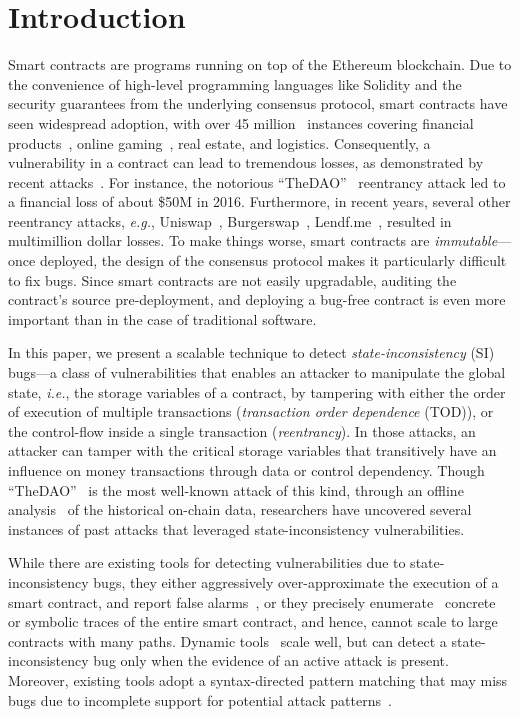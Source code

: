 \documentclass[conference, romanappendices]{tex/IEEEtran}
\theoremstyle{bfnote}
\newcommand{\solidity}{{\sc Solidity}\xspace}
\newcommand{\smart}{smart contract}
\newcommand{\ethereum}{Ethereum}
\newcommand{\reentrancy}{{reentrancy}\xspace}
\newcommand{\tod}{{transaction order dependence}\xspace}
\newcommand{\si}{{state-inconsistency}\xspace}
\newcommand{\eg}{\textit{e.g.}}
\newcommand{\ie}{\textit{i.e.}}
\begin{document}
 	\section{Introduction}
\label{introduction}
Smart contracts are programs running on top of the \ethereum{} blockchain.
Due to the convenience of high-level programming languages like \solidity and the security guarantees from the underlying consensus protocol, smart contracts have seen widespread adoption, with over 45 million~\cite{etherscan} instances covering financial products~\cite{case1}, online gaming~\cite{case2}, real estate, and logistics.
Consequently, a vulnerability in a contract can lead to tremendous losses, as demonstrated by recent attacks~\cite{attack1,attack2,attack3,attack4}.
For instance, the notorious ``TheDAO''~\cite{dao-attack} \reentrancy attack led to a financial loss of about \$50M in 2016.
Furthermore, in recent years, several other \reentrancy attacks, \eg,  Uniswap~\cite{uniswap-attack},  Burgerswap~\cite{burgerswap-attack}, Lendf.me~\cite{lendf-attack}, resulted in multimillion dollar losses.
To make things worse, smart contracts are \emph{immutable}---once deployed, the design of the consensus protocol makes it particularly difficult to fix bugs.
Since \smart s are not easily upgradable, auditing the contract's source pre-deployment, and deploying a bug-free contract is even more important than in the case of traditional software.

In this paper, we present a scalable technique to detect \emph{\si} (SI) bugs---a class of vulnerabilities that enables an attacker to manipulate the global state, \ie, the storage variables of a contract, by tampering with either the order of execution of multiple transactions (\emph{\tod} (TOD)), or the control-flow inside a single transaction (\emph{\reentrancy}).
In those attacks, an attacker can tamper with the critical storage variables that transitively have an influence on money transactions through data or control dependency.
Though ``TheDAO''~\cite{dao-attack} is the most well-known attack of this kind, through an offline analysis~\cite{txspector,sereum} of the historical on-chain data, researchers have uncovered several instances of past attacks that leveraged \si vulnerabilities. 

While there are existing tools for detecting vulnerabilities due to state-inconsistency bugs, they either aggressively over-approximate the execution of a smart contract, and report false alarms~\cite{securify,madmax}, or they precisely enumerate~\cite{mythril,oyente} concrete or symbolic traces of the entire smart contract, and hence, cannot scale to large contracts with many paths.
Dynamic tools~\cite{sereum,txspector} scale well, but can detect a \si bug only when the evidence of an active attack is present.
Moreover, existing tools adopt a syntax-directed pattern matching that may miss bugs due to incomplete support for potential attack patterns~\cite{securify}.
\end{document}
